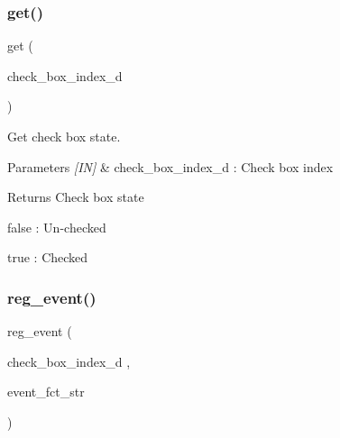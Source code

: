 \subsubsection{get()}
{\footnotesize\ttfamily get (\begin{DoxyParamCaption}\item[{check\+\_\+box\+\_\+index\+\_\+d}]{ }\end{DoxyParamCaption})}



Get check box state. 


\begin{DoxyCode}{0}
\end{DoxyCode}



\begin{DoxyParams}{Parameters}
{\em \mbox{[}\+I\+N\mbox{]}} & check\+\_\+box\+\_\+index\+\_\+d \+: Check box index \\
\hline
\end{DoxyParams}
\begin{DoxyReturn}{Returns}
Check box state \begin{DoxyItemize}
\item false \+: Un-\/checked \item true \+: Checked \end{DoxyItemize}

\end{DoxyReturn}
\mbox{\label{classcheck__box_aaf37880c52fb8441d4772e17fb8f6cbc}} 
\subsubsection{reg\_event()}
{\footnotesize\ttfamily reg\+\_\+event (\begin{DoxyParamCaption}\item[{check\+\_\+box\+\_\+index\+\_\+d}]{,  }\item[{event\+\_\+fct\+\_\+str}]{ }\end{DoxyParamCaption})}



